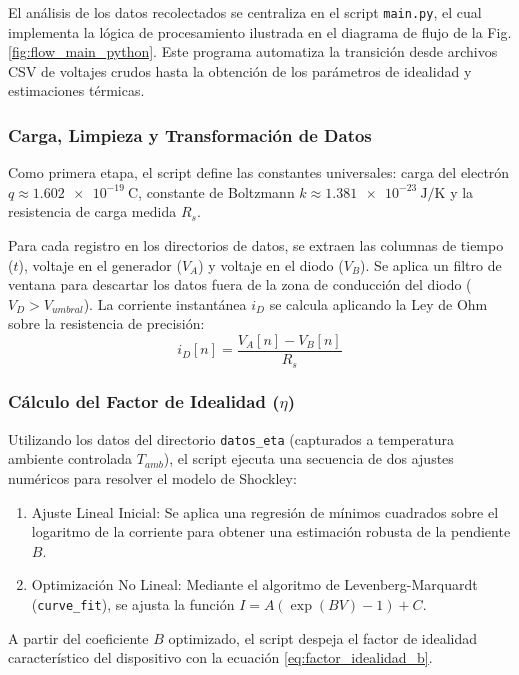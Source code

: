 \documentclass[conference]{IEEEtran}
\begin{document}
El análisis de los datos recolectados se centraliza en el script \texttt{main.py}, el cual implementa la lógica de procesamiento ilustrada en el diagrama de flujo de la Fig. \ref{fig:flow_main_python}. Este programa automatiza la transición desde archivos CSV de voltajes crudos hasta la obtención de los parámetros de idealidad y estimaciones térmicas.

\subsubsection{Carga, Limpieza y Transformación de Datos}
Como primera etapa, el script define las constantes universales: carga del electrón $q \approx \SI{1.602e-19}{\coulomb}$, constante de Boltzmann $k \approx \SI{1.381e-23}{\joule\per\kelvin}$ y la resistencia de carga medida $R_s$.

Para cada registro en los directorios de datos, se extraen las columnas de tiempo ($t$), voltaje en el generador ($V_A$) y voltaje en el diodo ($V_B$). Se aplica un filtro de ventana para descartar los datos fuera de la zona de conducción del diodo ($V_D > V_{umbral}$). La corriente instantánea $i_D$ se calcula aplicando la Ley de Ohm sobre la resistencia de precisión:
\begin{equation}
    i_D[n] = \frac{V_A[n] - V_B[n]}{R_s}
\end{equation}

\subsubsection{Cálculo del Factor de Idealidad ($\eta$)}
Utilizando los datos del directorio \texttt{datos\_eta} (capturados a temperatura ambiente controlada $T_{amb}$), el script ejecuta una secuencia de dos ajustes numéricos para resolver el modelo de Shockley:
\begin{enumerate}
    \item Ajuste Lineal Inicial: Se aplica una regresión de mínimos cuadrados sobre el logaritmo de la corriente para obtener una estimación robusta de la pendiente $B$.
    \item Optimización No Lineal: Mediante el algoritmo de Levenberg-Marquardt (\texttt{curve\_fit}), se ajusta la función $I = A(\exp(BV)-1) + C$.
\end{enumerate}
A partir del coeficiente $B$ optimizado, el script despeja el factor de idealidad característico del dispositivo con la ecuación \ref{eq:factor_idealidad_b}.
\end{document}
